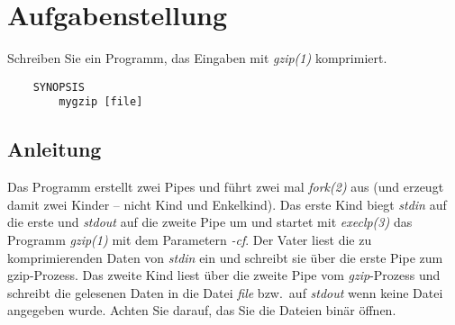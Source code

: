 




\section*{Aufgabenstellung}
Schreiben Sie ein Programm, das Eingaben mit \emph{gzip(1)} komprimiert.
\begin{verbatim}
    SYNOPSIS
        mygzip [file]
\end{verbatim}


\subsection*{Anleitung}
Das Programm erstellt zwei Pipes und führt zwei mal \emph{fork(2)} aus (und erzeugt damit zwei Kinder – nicht Kind und Enkelkind).
Das erste Kind biegt \emph{stdin} auf die erste und \emph{stdout} auf die zweite Pipe um und startet mit \emph{execlp(3)} das Programm \emph{gzip(1)} mit dem Parametern \emph{-cf}.
Der Vater liest die zu komprimierenden Daten von \emph{stdin} ein und schreibt sie über die erste Pipe zum gzip-Prozess.
Das zweite Kind liest über die zweite Pipe vom \emph{gzip}-Prozess und schreibt die gelesenen Daten in die Datei \emph{file} bzw.\ auf \emph{stdout} wenn keine Datei angegeben wurde.
Achten Sie darauf, das Sie die Dateien binär öffnen.

\osueguidelinestwo


